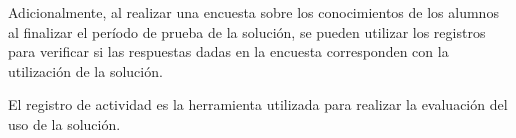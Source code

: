 Adicionalmente, al realizar una encuesta sobre los conocimientos de los alumnos
al finalizar el período de prueba de la solución, se pueden utilizar los registros para
verificar si las respuestas dadas en la encuesta corresponden con la utilización
de la solución.

El registro de actividad es la herramienta utilizada para realizar la evaluación
del uso de la solución.
